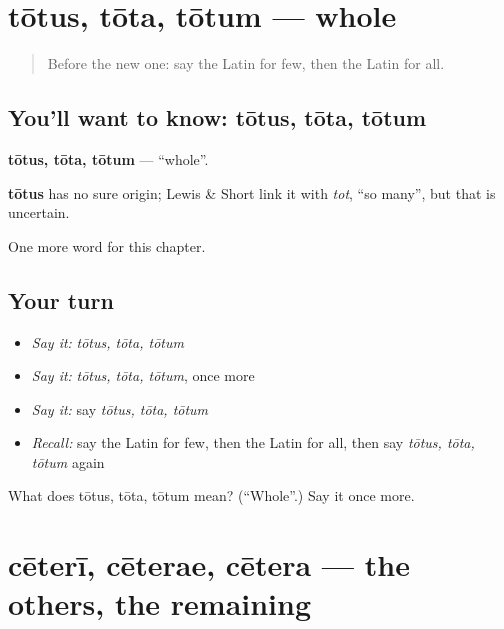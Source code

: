 \section[tōtus, tōta, tōtum]{tōtus, tōta, tōtum — whole}

\label{lesson:LA-C242-totus}



\begin{quote}
Before the new one: say the Latin for few, then the Latin for all.
\end{quote}

\subsection*{You'll want to know: tōtus, tōta, tōtum}
\textbf{tōtus, tōta, tōtum} — \textquotedblleft{}whole\textquotedblright{}.

\begin{cousinweb}
\textbf{tōtus} has no sure origin; Lewis \& Short link it with \emph{tot}, \textquotedblleft{}so many\textquotedblright{}, but that is uncertain.
\end{cousinweb}

\begin{grammarlens}[title={What you've built}]
One more word for this chapter.
\end{grammarlens}

\subsection*{Your turn}
\begin{itemize}
\raggedright
  \item \emph{Say it:} \emph{tōtus, tōta, tōtum}
  \item \emph{Say it:} \emph{tōtus, tōta, tōtum}, once more
  \item \emph{Say it:} say \emph{tōtus, tōta, tōtum}
  \item \emph{Recall:} say the Latin for few, then the Latin for all, then say \emph{tōtus, tōta, tōtum} again
\end{itemize}

\begin{tcolorbox}[breakable,colback=teal!4,colframe=teal!35!black,title={Before you move on}]
What does tōtus, tōta, tōtum mean? (\textquotedblleft{}Whole\textquotedblright{}.) Say it once more.
\end{tcolorbox}
\section[cēterī, cēterae, cētera]{cēterī, cēterae, cētera — the others, the remaining}


